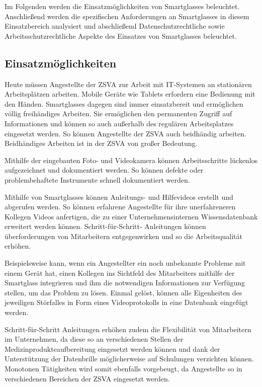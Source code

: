 Im Folgenden werden die Einsatzmöglichkeiten von Smartglasses beleuchtet. Anschließend werden die spezifischen Anforderungen an Smartglasses in diesem Einsatzbereich analysiert und abschließend Datenschutzrechtliche sowie Arbeitsschutzrechtliche Aspekte des Einsatzes von Smartglasses beleuchtet.
%
%
\subsection{Einsatzmöglichkeiten}
\label{sec:Einsatzmoeglichkeiten}
Heute müssen Angestellte der ZSVA zur Arbeit mit IT-Systemen an stationären Arbeitsplätzen arbeiten. Mobile Geräte wie Tablets erfordern eine Bedienung mit den Händen. Smartglasses dagegen sind immer einsatzbereit und ermöglichen völlig freihändiges Arbeiten. Sie ermöglichen den permanenten Zugriff auf Informationen und können so auch außerhalb des regulären Arbeitsplatzes eingesetzt werden. So können Angestellte der ZSVA auch beidhändig arbeiten. Beidhändiges Arbeiten ist in der ZSVA von großer Bedeutung.

Mithilfe der eingebauten Foto- und Videokamera können Arbeitsschritte lückenlos aufgezeichnet und dokumentiert werden. So können defekte oder problembehaftete Instrumente schnell dokumentiert werden.

Mithilfe von Smartglasses können Anleitungs- und Hilfevideos erstellt und abgerufen werden. So können erfahrene Angestellte für ihre unerfahreneren Kollegen Videos anfertigen, die zu einer Unternehmensinternen Wissensdatenbank erweitert werden können. Schritt-für-Schritt- Anleitungen können überforderungen von Mitarbeitern entgegenwirken und so die Arbeitsqualität erhöhen. 

Beispielsweise kann, wenn ein Angestellter ein noch unbekannte Probleme mit einem Gerät hat, einen Kollegen ins Sichtfeld des Mitarbeiters mithilfe der Smartglass integrieren und ihm die notwendigen Informationen zur Verfügung stellen, um das Problem zu lösen. Einmal gelöst, können alle Eigenheiten des jeweiligen Störfalles in Form eines Videoprotokolls in eine Datenbank eingefügt werden.

Schritt-für-Schritt Anleitungen erhöhen zudem die Flexibilität von Mitarbeitern im Unternehmen, da diese so an verschiedenen Stellen der Medizinprodukteaufbereitung eingesetzt werden können und dank der Unterstützung der Datenbrille möglicherweise auf Schulungen verzichten können. Monotonen Tätigkeiten wird somit ebenfalls vorgebeugt, da Angestellte so in verschiedenen Bereichen der ZSVA eingesetzt werden.

